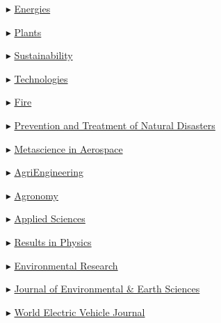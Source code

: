 \begin{itemize}
    \item[$\blacktriangleright$] \href{https://www.mdpi.com/journal/energies/}{Energies}

    \item[$\blacktriangleright$] \href{https://www.mdpi.com/journal/plants/}{Plants}

    \item[$\blacktriangleright$] \href{https://www.mdpi.com/journal/sustainability/}{Sustainability}

    \item[$\blacktriangleright$] \href{https://www.mdpi.com/journal/technologies/}{Technologies}

    \item[$\blacktriangleright$] \href{https://www.mdpi.com/journal/fire/}{Fire}

    \item[$\blacktriangleright$] \href{https://ojs.ukscip.com/index.php/ptnd/}{Prevention and Treatment of Natural Disasters}

    \item[$\blacktriangleright$] \href{https://www.aimspress.com/journal/mina/}{Metascience in Aerospace}

    \item[$\blacktriangleright$] \href{https://www.mdpi.com/journal/agriengineering/}{AgriEngineering}
    
    \item[$\blacktriangleright$] \href{https://www.mdpi.com/journal/agronomy/}{Agronomy}

    \item[$\blacktriangleright$] \href{https://www.mdpi.com/journal/applsci/}{Applied Sciences}

    \item[$\blacktriangleright$] \href{https://www.sciencedirect.com/journal/results-in-physics/}{Results in Physics}

    \item[$\blacktriangleright$] \href{https://www.sciencedirect.com/journal/environmental-research/ }{Environmental Research}
    
    \item[$\blacktriangleright$] \href{https://journals.bilpubgroup.com/index.php/jees/}{Journal of Environmental \& Earth Sciences}

    \item[$\blacktriangleright$] \href{https://www.mdpi.com/journal/wevj/}{World Electric Vehicle Journal}
    
\end{itemize}

